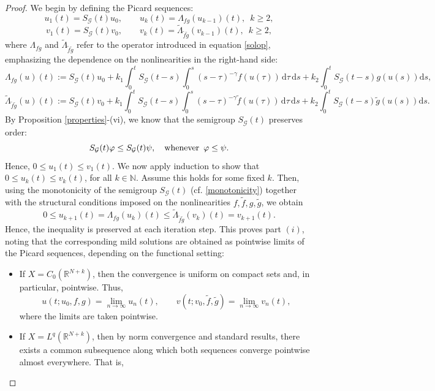 \documentclass[10pt,a4paper]{amsart}
\def\N{\mathbb{N}}
\begin{document}
\begin{proof} We begin by defining the Picard sequences:
	$$u_{1}(t) =S_\mathcal{G}(t)u_0,\qquad u_{k}(t) =\Lambda_{fg} (u_{k-1})(t),\,\,\, k\geq2 ,$$
	$$v_{1}(t) =S_\mathcal{G}(t)v_0 ,\qquad v_{k}(t) =\widetilde{\Lambda}_{\tilde{f}\tilde{g}} (v_{k-1})(t),\,\,\, k\geq2 , $$
	where $\Lambda_{fg}$ and $\widetilde{\Lambda}_{\tilde{f}\tilde{g}}$ refer to the operator introduced in equation \eqref{solop}, emphasizing the dependence on the nonlinearities in the right-hand side:
	\begin{equation}\label{lambdafg}
		\Lambda_{fg}(u)(t):=S_{\mathcal{G}}(t)u_0 +k_1 \int_{0}^{t}S_{\mathcal{G}}(t-s) \int_0^s(s-\tau)^{-\gamma}f(u(\tau))\, \mathrm{d}\tau \,\mathrm{d}s +k_2 \int_{0}^{t}S_{\mathcal{G}}(t-s)g(u(s)) \mathrm{d}s,
	\end{equation}
	$$\widetilde{\Lambda}_{\tilde{f}\tilde{g}}(u)(t):=S_{\mathcal{G}}(t)v_0 +k_1 \int_{0}^{t}S_{\mathcal{G}}(t-s) \int_0^s(s-\tau)^{-\gamma}\tilde{f}(u(\tau))\, \mathrm{d}\tau \,\mathrm{d}s +k_2 \int_{0}^{t}S_{\mathcal{G}}(t-s)\tilde{g}(u(s)) \mathrm{d}s.$$
	By Proposition \ref{properties}-(vi), we know that the semigroup $S_\mathcal{G}(t)$ preserves order:
	\begin{equation}\label{monotonicity}
		S_\mathcal{G}( t)\varphi \leq S_\mathcal{G}(t)\psi,\quad \hbox{whenever}\,\,\, \varphi\leq \psi.
	\end{equation} 
	Hence, $0\leq u_1(t)\leq v_1(t)$. We now apply induction to show that $0\leq u_k(t)\leq v_k(t)$, for all $k\in\N$. Assume this holds for some fixed $k$. Then, using the monotonicity of the semigroup $S_\mathcal{G}(t)$ (cf. \eqref{monotonicity}) together with the structural conditions imposed on the nonlinearities $f, \tilde{f},g,\tilde{g}$, we obtain
	$$0\leq u_{k+1}(t)=\Lambda_{fg}(u_k)(t)\leq \widetilde{\Lambda}_{\tilde{f}\tilde{g}}(v_k)(t)=v_{k+1}(t).$$
	Hence, the inequality is preserved at each iteration step. This proves part $(i)$, noting that the corresponding mild solutions are obtained as pointwise limits of the Picard sequences, depending on the functional setting:
	\begin{itemize}
		\item  If $X=C_0(\mathbb{R}^{N+k})$, then the convergence is uniform on compact sets and, in particular, pointwise. Thus,
		$$u(t;u_0,f,g) = \lim\limits_{n\rightarrow\infty} u_n(t),\qquad  v(t;v_0,\tilde{f},\tilde{g}) = \lim\limits_{n\rightarrow\infty} v_n(t),$$
		where the limits are taken pointwise.
		\item  If $X=L^q(\mathbb{R}^{N+k})$,  then by norm convergence and standard results, there exists a common subsequence along which both sequences converge pointwise almost everywhere. That is,

\end{itemize}
\end{proof}
\end{document}
